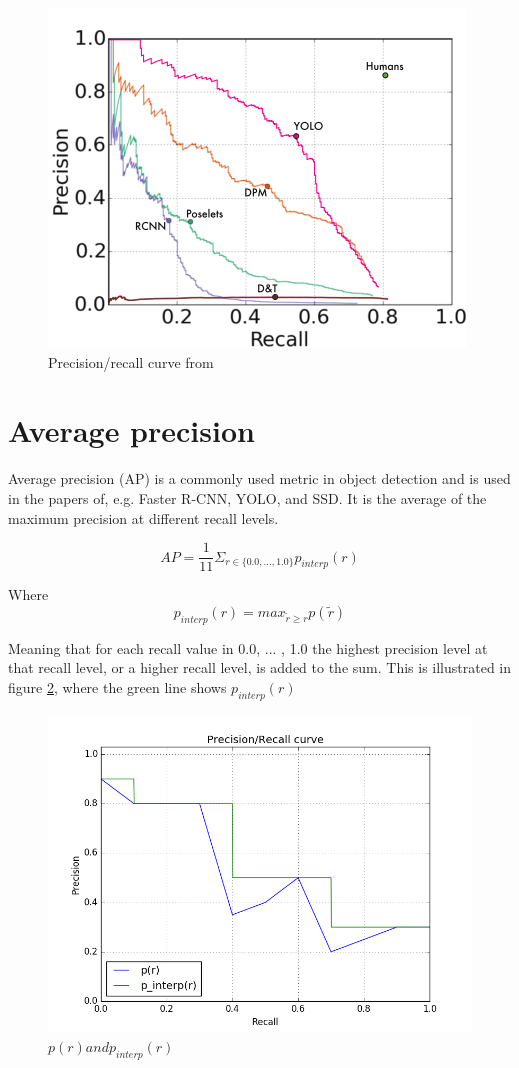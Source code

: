 \begin{figure}[h!]
    \centering
    \includegraphics[scale=0.4]{fig/yolo_prec_recall.png} 
    \caption{Precision/recall curve from \citep{YOLOv1}}
    \label{fig:yolo_prec_recall}
\end{figure}

\section{Average precision}
Average precision (AP) is a commonly used metric in object detection and is used in the papers of, e.g. Faster R-CNN, YOLO, and SSD. It is the average of the maximum precision at different recall levels.

\begin{equation}
    AP = \frac{1}{11} \Sigma_{r \in \{0.0, ... , 1.0\}} p_{interp}(r)
\end{equation}

Where
\begin{equation}
    p_{interp}(r) = max_{\tilde{r} \geq r} p(\tilde{r})
\end{equation}

Meaning that for each recall value in {0.0, ... , 1.0} the highest precision level at that recall level, or a higher recall level, is added to the sum. This is illustrated in figure \ref{fig:p_interp}, where the green line shows $p_{interp}(r)$

\begin{figure}[h!]
    \centering
    \includegraphics[scale=0.6]{fig/p_interp.png}
    \caption{$p(r) and p_{interp}(r)$}
    \label{fig:p_interp}
\end{figure}




\cleardoublepage